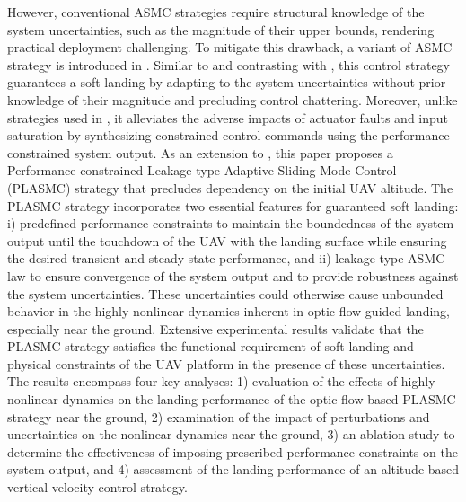 \documentclass{IEEEtaes}
\begin{document}
However, conventional ASMC strategies require structural knowledge of the system uncertainties, such as the magnitude of their upper bounds, rendering practical deployment challenging.
To mitigate this drawback, a variant of ASMC strategy is introduced in \cite{singhal2023}.
Similar to \cite{li2022} and contrasting with \cite{nekoo2021}, this control strategy guarantees a soft landing by adapting to the system uncertainties without prior knowledge of their magnitude and precluding control chattering.
Moreover, unlike strategies used in \cite{chang2023}, it alleviates the adverse impacts of actuator faults and input saturation by synthesizing constrained control commands using the performance-constrained system output.
As an extension to \cite{singhal2023}, this paper proposes a Performance-constrained Leakage-type Adaptive Sliding Mode Control (PLASMC) strategy that precludes dependency on the initial UAV altitude.
The PLASMC strategy incorporates two essential features for guaranteed soft landing:
i) predefined performance constraints to maintain the boundedness of the system output until the touchdown of the UAV with the landing surface while ensuring the desired transient and steady-state performance, and
ii) leakage-type ASMC law to ensure convergence of the system output and to provide robustness against the system uncertainties.
These uncertainties could otherwise cause unbounded behavior in the highly nonlinear dynamics inherent in optic flow-guided landing, especially near the ground.
Extensive experimental results validate that the PLASMC strategy satisfies the functional requirement of soft landing and physical constraints of the UAV platform in the presence of these uncertainties.
The results encompass four key analyses:
1)  evaluation of the effects of highly nonlinear dynamics on the landing performance of the optic flow-based PLASMC strategy near the ground,
2) examination of the impact of perturbations and uncertainties on the nonlinear dynamics near the ground,
3) an ablation study to determine the effectiveness of imposing prescribed performance constraints on the system output, and
4) assessment of the landing performance of an altitude-based vertical velocity control strategy.
\end{document}
